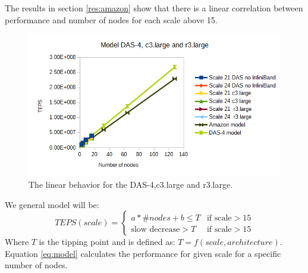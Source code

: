 The results in section \ref{res:amazon} show that there is a linear correlation between performance and number of nodes for each scale above 15. 


\begin{figure}[!h]
	\includegraphics[width=\textwidth]{images/model_figure_1.png}
	\caption{The linear behavior for the DAS-4,c3.large and r3.large.}
	\label{fig:model_first}
\end{figure}

We general model will be:
\begin{equation}
\label{eq:model}
 TEPS(scale) = 
 \begin{cases} 
	 a * \# nodes + b \leq T & \text{if scale} > 15  \\ \text{slow decrease} > T & \text{if scale} > 15
 \end{cases}
\end{equation}
Where $T$ is the tipping point and is defined as: $T = f(scale, architecture)$. Equation \ref{eq:model} calculates the performance for given scale for a specific number of nodes.

